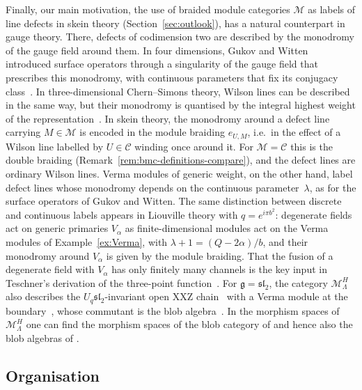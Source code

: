 \documentclass[12pt,dvipsnames]{article}
\numberwithin{equation}{section}
\theoremstyle{definition}
\newcommand{\cat}[1]{\mathcal{#1}}
\newcommand{\1}{\ensuremath{\mathbbm{1}}}
\begin{document}
Finally, our main motivation, the use of braided module categories $\cat{M}$
as labels of line defects in skein theory (Section~\ref{sec:outlook}), has a
natural counterpart in gauge theory. There, defects of codimension two are
described by the monodromy of the gauge field around them. In four dimensions,
Gukov and Witten introduced surface operators through a singularity of the
gauge field that prescribes this monodromy, with continuous parameters that fix
its conjugacy class~\cite{GW06}. In three-dimensional Chern--Simons theory,
Wilson lines can be described in the same way, but their monodromy is quantised
by the integral highest weight of the representation~\cite{Wi11}. In skein
theory, the monodromy around a defect line carrying $M\in\cat{M}$ is encoded
in the module braiding $e_{U,M}$, i.e.\ in the effect of a Wilson line labelled
by $U\in\mathcal{C}$ winding once around it. For $\cat{M}=\mathcal{C}$ this
is the double braiding (Remark~\ref{rem:bmc-definitions-compare}), and the
defect lines are ordinary Wilson lines. Verma modules of generic weight, on the
other hand, label defect lines whose monodromy depends on the continuous
parameter~$\lambda$, as for the surface operators of Gukov and Witten. The same
distinction between discrete and continuous labels appears in Liouville theory
with $q=e^{i\pi b^2}$: degenerate fields act on generic primaries $V_\alpha$ as
finite-dimensional modules act on the Verma modules of Example~\ref{ex:Verma},
with $\lambda+1=(Q-2\alpha)/b$, and their monodromy around $V_\alpha$ is given
by the module braiding. That the fusion of a degenerate field with $V_\alpha$
has only finitely many channels is the key input in Teschner's derivation of
the three-point function~\cite{Te95}.
For $\mathfrak{g}=\mathfrak{sl}_2$, the category $\cat{M}^H_\Lambda$ also describes the
$U_q\mathfrak{sl}_2$-invariant open XXZ chain~\cite{PS90} with a Verma module
at the boundary~\cite{CGS22}, whose commutant is the blob algebra~\cite{MS93}.
In the morphism spaces of $\cat{M}_\Lambda^H$ one can find the morphism spaces 
of the blob category of \cite{ILZ18,LNV20} and hence also the blob algebras of \cite{MS93}.

\subsection{Organisation}
\end{document}
